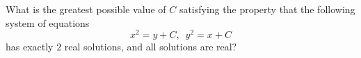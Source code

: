 What is the greatest possible value of $C$ satisfying the property that the following system of equations \[x^2 = y + C, \,\,\, y^2 = x + C\]has exactly $2$ real solutions, and all solutions are real?
